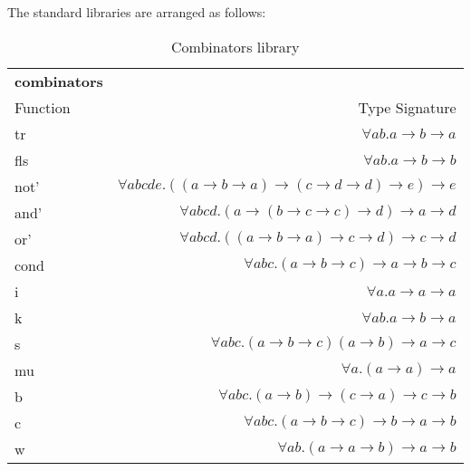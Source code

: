 The standard libraries are arranged as follows:

\begin{table}[H]
    \begin{tabular}{l r}
    \rowcolor{light-gray}
        \textbf{combinators} & \\
        Function & Type Signature \\
        \hline
        tr & $\forall a b. a \rightarrow b \rightarrow a$ \\
        fls & $\forall a b. a \rightarrow b \rightarrow b$ \\
        not' & $\forall a b c d e. ((a \rightarrow b \rightarrow a) \rightarrow (c \rightarrow d \rightarrow d) \rightarrow e) \rightarrow e$ \\
        and' & $\forall a b c d. (a \rightarrow (b \rightarrow c \rightarrow c) \rightarrow d) \rightarrow a \rightarrow d$ \\
        or' & $\forall a b c d. ((a \rightarrow b \rightarrow a) \rightarrow c \rightarrow d) \rightarrow c \rightarrow d$ \\
        cond & $\forall a b c. (a \rightarrow b \rightarrow c) \rightarrow a \rightarrow b \rightarrow c$ \\
        i & $\forall a. a \rightarrow a \rightarrow a$ \\
        k & $\forall a b. a \rightarrow b \rightarrow a$ \\
        s & $\forall a b c. (a \rightarrow b \rightarrow c) (a \rightarrow b) \rightarrow a \rightarrow c$ \\
        mu & $\forall a. (a \rightarrow a) \rightarrow a$ \\
        b & $\forall a b c. (a \rightarrow b) \rightarrow (c \rightarrow a) \rightarrow c \rightarrow b$\\
        c & $\forall a b c. (a \rightarrow b \rightarrow c) \rightarrow b \rightarrow a \rightarrow b$ \\
        w & $\forall a b. (a \rightarrow a \rightarrow b) \rightarrow a \rightarrow b$ \\
    \end{tabular}
    \caption{Combinators library}
\label{table:combinators}
\end{table}


